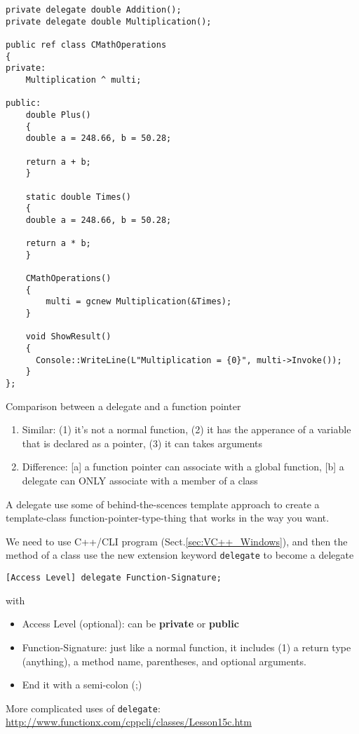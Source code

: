\begin{verbatim}
private delegate double Addition();
private delegate double Multiplication();

public ref class CMathOperations
{
private:
    Multiplication ^ multi;
    
public:
    double Plus()
    {
	double a = 248.66, b = 50.28;

	return a + b;
    }

    static double Times()
    {
	double a = 248.66, b = 50.28;

	return a * b;
    }
    
    CMathOperations()
    {
        multi = gcnew Multiplication(&Times);
    }
    
    void ShowResult()
    {
	  Console::WriteLine(L"Multiplication = {0}", multi->Invoke());
    }    
};
\end{verbatim}

Comparison between a delegate and a function pointer
\begin{enumerate}
  \item Similar: (1) it's not a normal function, (2) it has the apperance of a
  variable that is declared as a pointer, (3) it can takes arguments
  \item Difference: [a]	a function pointer can associate with a global function,
  [b] a delegate can ONLY associate with a member of a class
\end{enumerate}
A delegate use some of behind-the-scences template approach to create a
template-class function-pointer-type-thing that works in the way you want. 
 
We need to use C++/CLI program (Sect.\ref{sec:VC++_Windows}), and then the
method of a class use the new extension keyword \verb!delegate! to become a
delegate
\begin{verbatim}
[Access Level] delegate Function-Signature;
\end{verbatim}
with
\begin{itemize}
  \item Access Level (optional): can be {\bf private} or {\bf public}
  \item Function-Signature: just like a normal function, it includes (1) a
  return type (anything), a method name, parentheses, and optional arguments.
  \item End it with a semi-colon (;)
\end{itemize}

More complicated uses of \verb!delegate!:
\url{http://www.functionx.com/cppcli/classes/Lesson15c.htm}	

